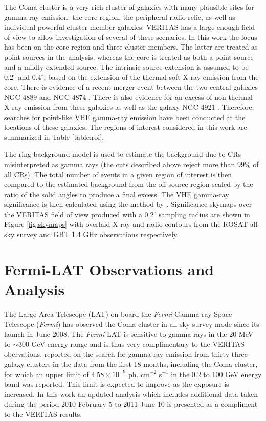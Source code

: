 \documentclass[12pt,manuscript]{aastex}
\begin{document}
The Coma cluster is a very rich cluster of galaxies with many plausible sites for gamma-ray emission: the core region, the peripheral radio relic, as well as individual powerful cluster member galaxies. VERITAS has a large enough field of view to allow investigation of several of these scenarios. In this work the focus has been on the core region and three cluster members. The latter are treated as point sources in the analysis, whereas the core is treated as both a point source and a mildly extended source. The intrinsic source extension is assumed to be $0.2^{\circ}$ and $0.4^{\circ}$, based on the extension of the thermal soft X-ray emission from the core. There is evidence of a recent merger event between the two central galaxies NGC 4889 and NGC 4874 \citep{article:Tribble:1993}. There is also evidence for an excess of non-thermal X-ray emission from these galaxies as well as the galaxy NGC 4921 \citep{article:Neumann_etal:2003}. Therefore, searches for point-like VHE gamma-ray emission have been conducted at the locations of these galaxies. The regions of interest considered in this work are summarized in Table \ref{table:roi}.

The ring background model \citep{article:Aharonian_etal:2001} is used to estimate the background due to CRs misinterpreted as gamma rays (the cuts described above reject more than 99\% of all CRs). The total number of events in a given region of interest is then compared to the estimated background from the off-source region scaled by the ratio of the solid angles to produce a final excess. The VHE gamma-ray significance is then calculated using the method by \citet{article:LiMa:1983}.  Significance skymaps over the VERITAS field of view produced with a $0.2^{\circ}$ sampling radius are shown in Figure \ref{fig:skymaps} with overlaid X-ray and radio contours from the ROSAT all-sky survey \citep{article:BrielHenryBohringer:1992}  and GBT 1.4 GHz observations \citep{article:BrownRudnick:2010} respectively.

\section{Fermi-LAT Observations and Analysis}
The Large Area Telescope (LAT) on board the \emph{Fermi} Gamma-ray Space Telescope (\emph{Fermi}) has observed the Coma cluster in all-sky survey mode since its launch in June 2008. The \emph{Fermi}-LAT is sensitive to gamma rays in the 20 MeV to $\sim$300 GeV energy range and is thus very complimentary to the VERITAS obervations. \citet{article:Ackermann_etal:2010} reported on the search for gamma-ray emission from thirty-three galaxy clusters in the data from the first 18 months, including the Coma cluster, for which an upper limit of $4.58\times 10^{-9}$ ph. cm$^{-2}$ s$^{-1}$ in the 0.2 to 100 GeV energy band was reported. This limit is expected to improve as the exposure is increased. In this work an updated analysis which includes additional data taken during the period 2010 February 5 to 2011 June 10 is presented as a compliment to the VERITAS results.
\end{document}
